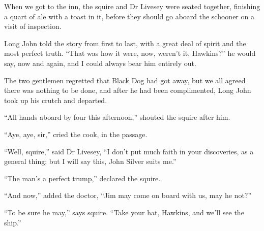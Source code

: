 When we got to the inn, the squire and Dr Livesey were seated together, finishing a quart of ale with a toast in it, before they should go aboard the schooner on a visit of inspection.

Long John told the story from first to last, with a great deal of spirit and the most perfect truth. \enquote{That was how it were, now, weren’t it, Hawkins?} he would say, now and again, and I could always bear him entirely out.

The two gentlemen regretted that Black Dog had got away, but we all agreed there was nothing to be done, and after he had been complimented, Long John took up his crutch and departed.

\enquote{All hands aboard by four this afternoon,} shouted the squire after him.

\enquote{Aye, aye, sir,} cried the cook, in the passage.

\enquote{Well, squire,} said Dr Livesey, \enquote{I don’t put much faith in your discoveries, as a general thing; but I will say this, John Silver suits me.}

\enquote{The man’s a perfect trump,} declared the squire.

\enquote{And now,} added the doctor, \enquote{Jim may come on board with us, may he not?}

\enquote{To be sure he may,} says squire. \enquote{Take your hat, Hawkins, and we’ll see the ship.}